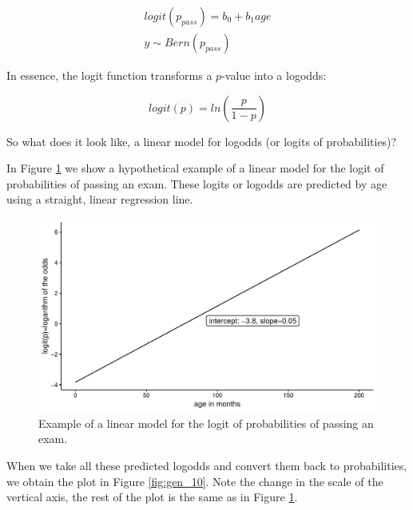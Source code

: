 \documentclass[]{book}\usepackage[]{graphicx}\usepackage[]{color}
\makeatletter
\def\maxwidth{ %
  \ifdim\Gin@nat@width>\linewidth
    \linewidth
  \else
    \Gin@nat@width
  \fi
}
\newenvironment{knitrout}{}{} %
\makeatother
\begin{document}
\begin{eqnarray}
logit(p_{pass}) = b_0 + b_1 age \\
y \sim Bern(p_{pass})
\end{eqnarray}

In essence, the logit function transforms a $p$-value into a logodds:

\begin{equation}
logit(p)= ln( \frac{p}{1-p} ) \nonumber
\end{equation}

So what does it look like, a linear model for logodds (or logits of probabilities)?

In Figure \ref{fig:gen_9} we show a hypothetical example of a linear model for the logit of probabilities of passing an exam. These logits or logodds are predicted by age using a straight, linear regression line.


\begin{knitrout}
\color{fgcolor}\begin{figure}

{\centering \includegraphics[width=\maxwidth]{figure/gen_9-1} 

}

\caption[Example of a linear model for the logit of probabilities of passing an exam]{Example of a linear model for the logit of probabilities of passing an exam.}\label{fig:gen_9}
\end{figure}


\end{knitrout}
% 
When we take all these predicted logodds and convert them back to probabilities, we obtain the plot in Figure \ref{fig:gen_10}. Note the change in the scale of the vertical axis, the rest of the plot is the same as in Figure \ref{fig:gen_9}.
\end{document}

